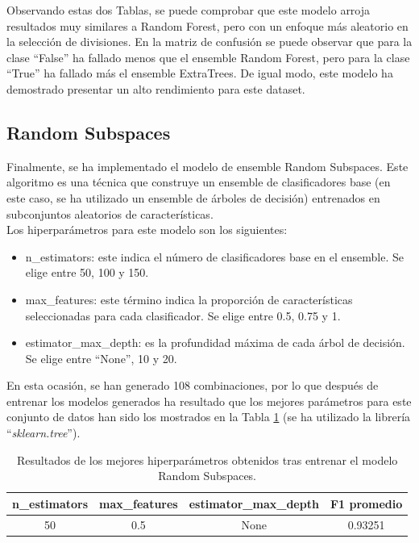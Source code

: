 \documentclass[12pt,letterpaper]{article}
\begin{document}
Observando estas dos Tablas, se puede comprobar que este modelo arroja resultados muy similares a Random Forest, pero con un enfoque más aleatorio en la selección de divisiones. En la matriz de confusión se puede observar que para la clase ``False'' ha fallado menos que el ensemble Random Forest, pero para la clase ``True'' ha fallado más el ensemble ExtraTrees. De igual modo, este modelo ha demostrado presentar un alto rendimiento para este dataset.

\subsection{Random Subspaces}
Finalmente, se ha implementado el modelo de ensemble Random Subspaces. Este algoritmo es una técnica que construye un ensemble de clasificadores base (en este caso, se ha utilizado un ensemble de árboles de decisión) entrenados en subconjuntos aleatorios de características.\\
Los hiperparámetros para este modelo son los siguientes:
\begin{itemize}
    \item n\_estimators: este indica el número de clasificadores base en el ensemble. Se elige entre 50, 100 y 150.
    \item max\_features: este término indica la proporción de características seleccionadas para cada clasificador. Se elige entre 0.5, 0.75 y 1.
    \item estimator\_max\_depth: es la profundidad máxima de cada árbol de decisión. Se elige entre ``None'', 10 y 20.
\end{itemize}

En esta ocasión, se han generado 108 combinaciones, por lo que después de entrenar los modelos generados ha resultado que los mejores parámetros para este conjunto de datos han sido los mostrados en la Tabla \ref{tab:hiper-RS} (se ha utilizado la librería ``\textit{sklearn.tree}'').
\begin{table}[H]
    \centering
    \begin{tabular}{ccc|c}
    \hline
    \textbf{n\_estimators} &  \textbf{max\_features} & \textbf{estimator\_max\_depth } & \textbf{F1 promedio} \\ \hline
    50 & 0.5 & None & 0.93251 \\ \hline
    \end{tabular}
    \caption{Resultados de los mejores hiperparámetros obtenidos tras entrenar el modelo Random Subspaces.}
    \label{tab:hiper-RS}
\end{table}
\end{document}
